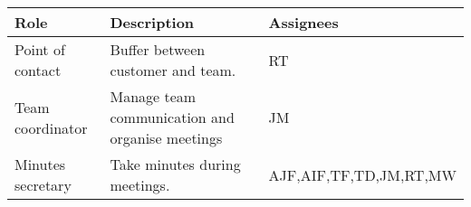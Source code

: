 \begin{table}[H]
\begin{tabular}{ | p{3.5cm} | p{8.5cm} | p{4.5cm} |}
\hline
\textbf{Role}	        &   \textbf{Description}                                                                   & \textbf{Assignees}                         \\ \hline
Point of contact         &   Buffer between customer and team.                                        & RT                                                 \\ \hline
Team coordinator      &   Manage team communication and organise meetings            & JM           				         \\ \hline
Minutes secretary     &   Take minutes during meetings.                                                & AJF,AIF,TF,TD,JM,RT,MW             \\ \hline

\end{tabular}
\end{table}